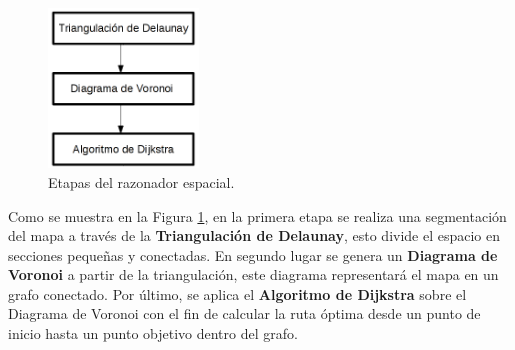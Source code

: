 \documentclass[11pt,twoside,A5]{article}
\newcommand{\reffigure}[1]{Figura \ref{#1}}
\begin{document}
\begin{figure}[H]
\begin{center}
\includegraphics[width=4cm]{razonador-espacial.png} 
\caption{Etapas del razonador espacial.}
\label{fig:razonador-espacial}
\end{center}
\end{figure}

Como se muestra en la \reffigure{fig:razonador-espacial}, en la primera etapa se realiza una segmentación del mapa
a través de la \textbf{Triangulación de Delaunay}, esto divide el espacio en secciones pequeñas y conectadas. En segundo lugar
se genera un \textbf{Diagrama de Voronoi} a partir de la triangulación, este diagrama representará el mapa
en un grafo conectado. Por último, se aplica el \textbf{Algoritmo de Dijkstra} sobre el Diagrama de Voronoi con el fin
de calcular la ruta óptima desde un punto de inicio hasta un punto objetivo dentro del grafo.
\end{document}
